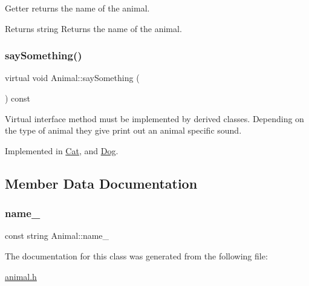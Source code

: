 Getter returns the name of the animal.

\begin{DoxyReturn}{Returns}
string Returns the name of the animal. 
\end{DoxyReturn}
\mbox{\label{classAnimal_a1da8e52d19af5bd43a3755d9d5454598}} 
\subsubsection{\texorpdfstring{say\+Something()}{saySomething()}}
{\footnotesize\ttfamily virtual void Animal\+::say\+Something (\begin{DoxyParamCaption}{ }\end{DoxyParamCaption}) const\hspace{0.3cm}{\ttfamily [pure virtual]}}

Virtual interface method must be implemented by derived classes. Depending on the type of animal they give print out an animal specific sound. 

Implemented in \hyperlink{classCat_a2da2143abb847a8719e302614ccb8d2e}{Cat}, and \hyperlink{classDog_aa76235fa1a137f2fccf5138e5b92d0b3}{Dog}.



\subsection{Member Data Documentation}
\mbox{\label{classAnimal_af9bbbc58067910197fe5d7330e5cf09a}} 
\subsubsection{\texorpdfstring{name\+\_\+}{name\_}}
{\footnotesize\ttfamily const string Animal\+::name\+\_\+\hspace{0.3cm}{\ttfamily [private]}}



The documentation for this class was generated from the following file\+:\begin{DoxyCompactItemize}
\item 
\hyperlink{animal_8h}{animal.\+h}\end{DoxyCompactItemize}
